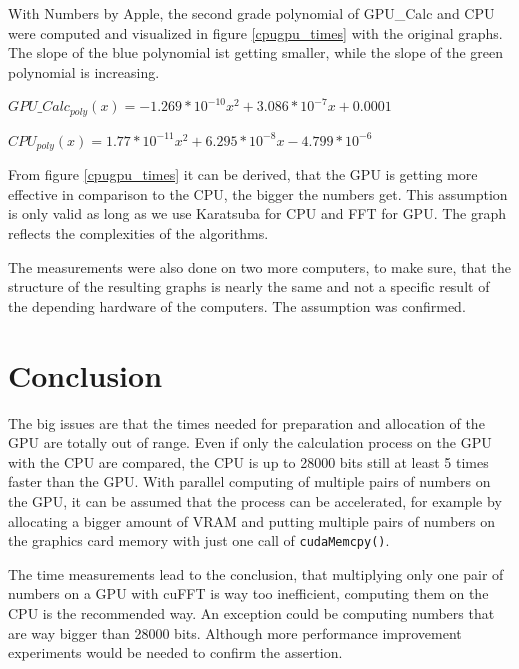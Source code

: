 \documentclass[12pt,a4paper]{article}
\begin{document}
 With Numbers by Apple, the second grade polynomial of GPU\_Calc and CPU were computed and visualized in figure \ref{cpugpu_times} with the original graphs. The slope of the blue polynomial ist getting smaller, while the slope of the green polynomial is increasing.

\begin{center}
    $GPU\_Calc_{poly}(x) = -1.269*10^{-10}x^2 + 3.086*10^{-7}x + 0.0001$
\end{center}

\begin{center}
    $CPU_{poly}(x) = 1.77*10^{-11}x^2 + 6.295*10^{-8}x - 4.799*10^{-6}$
\end{center}

From figure \ref{cpugpu_times} it can be derived, that the GPU is getting more effective in comparison to the CPU, the bigger the numbers get. This assumption is only valid as long as we use Karatsuba for CPU and FFT for GPU. The graph reflects the complexities of the algorithms.

The measurements were also done on two more computers, to make sure, that the structure of the resulting graphs is nearly the same and not a specific result of the depending hardware of the computers. The assumption was confirmed.

\section{Conclusion}
The big issues are that the times needed for preparation and allocation of the GPU are totally out of range. Even if only the calculation process on the GPU with the CPU are compared, the CPU is up to 28000 bits still at least 5 times faster than the GPU. With parallel computing of multiple pairs of numbers on the GPU, it can be assumed that the process can be accelerated, for example by allocating a bigger amount of VRAM and putting multiple pairs of numbers on the graphics card memory with just one call of \texttt{cudaMemcpy()}.

The time measurements lead to the conclusion, that multiplying only one pair of numbers on a GPU with cuFFT is way too inefficient, computing them on the CPU is the recommended way. An exception could be computing numbers that are way bigger than 28000 bits. Although more performance improvement experiments would be needed to confirm the assertion.


\end{document}
